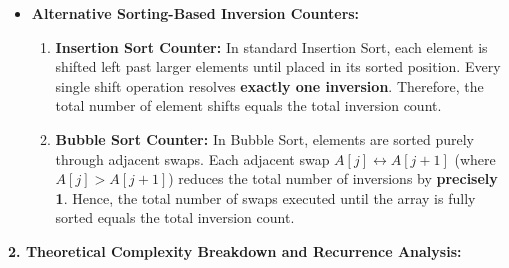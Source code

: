 \documentclass[12pt]{article}
\begin{document}
\begin{itemize}
    \item \textbf{Alternative Sorting-Based Inversion Counters:}
    \begin{enumerate}
        \item \textbf{Insertion Sort Counter:} In standard Insertion Sort, each element is shifted left past larger elements until placed in its sorted position. Every single shift operation resolves \textbf{exactly one inversion}. Therefore, the total number of element shifts equals the total inversion count.
        \item \textbf{Bubble Sort Counter:} In Bubble Sort, elements are sorted purely through adjacent swaps. Each adjacent swap $A[j] \leftrightarrow A[j+1]$ (where $A[j] > A[j+1]$) reduces the total number of inversions by \textbf{precisely 1}. Hence, the total number of swaps executed until the array is fully sorted equals the total inversion count.
    \end{enumerate}
\end{itemize}

\vspace{0.3cm}

\textbf{2. Theoretical Complexity Breakdown and Recurrence Analysis:}
\end{document}
